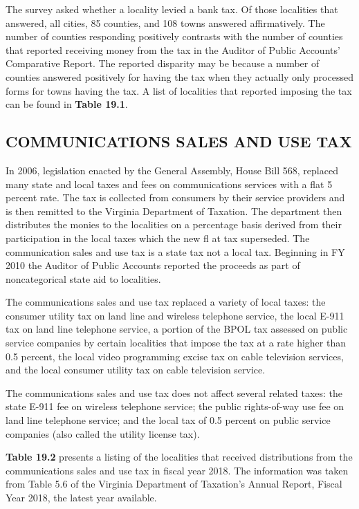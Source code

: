 \documentclass[
]{book}
\begin{document}
The survey asked whether a locality levied a bank tax. Of those localities that answered, all cities, 85 counties, and 108 towns answered affirmatively. The number of counties responding positively contrasts with the number of counties that reported receiving money from the tax in the Auditor of Public Accounts' Comparative Report. The reported disparity may be because a number of counties answered positively for having the tax when they actually only processed forms for towns having the tax. A list of localities that reported imposing the tax can be found in \textbf{Table 19.1}.

\hypertarget{communications-sales-and-use-tax}{%
\subsection{COMMUNICATIONS SALES AND USE TAX}\label{communications-sales-and-use-tax}}

In 2006, legislation enacted by the General Assembly, House Bill 568, replaced many state and local taxes and fees on communications services with a flat 5 percent rate. The tax is collected from consumers by their service providers and is then remitted to the Virginia Department of Taxation. The department then distributes the monies to the localities on a percentage basis derived from their participation in the local taxes which the new fl at tax superseded. The communication sales and use tax is a state tax not a local tax. Beginning in FY 2010 the Auditor of Public Accounts reported the proceeds as part of noncategorical state aid to localities.

The communications sales and use tax replaced a variety of local taxes: the consumer utility tax on land line and wireless telephone service, the local E-911 tax on land line telephone service, a portion of the BPOL tax assessed on public service companies by certain localities that impose the tax at a rate higher than 0.5 percent, the local video programming excise tax on cable television services, and the local consumer utility tax on cable television service.

The communications sales and use tax does not affect several related taxes: the state E-911 fee on wireless telephone service; the public rights-of-way use fee on land line telephone service; and the local tax of 0.5 percent on public service companies (also called the utility license tax).

\textbf{Table 19.2} presents a listing of the localities that received distributions from the communications sales and use tax in fiscal year 2018. The information was taken from Table 5.6 of the Virginia Department of Taxation's Annual Report, Fiscal Year 2018, the latest year available.
\end{document}
